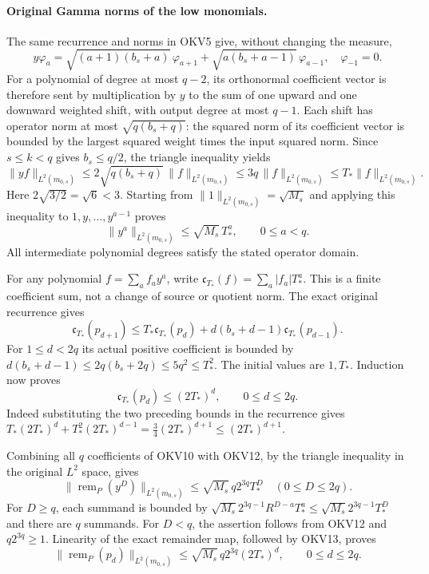 \documentclass[11pt,a4paper]{article}
\begin{document}
\paragraph{Original Gamma norms of the low monomials.}
The same recurrence and norms in OKV5 give, without changing the measure,
\[
 y\varphi_a=\sqrt{(a+1)(b_s+a)}\,\varphi_{a+1}
          +\sqrt{a(b_s+a-1)}\,\varphi_{a-1},
 \quad \varphi_{-1}=0.
 \tag{OKV11}
\]
For a polynomial of degree at most $q-2$, its orthonormal coefficient
vector is therefore sent by multiplication by $y$ to the sum of
one upward and one downward weighted shift, with output degree at most
$q-1$. Each shift has operator norm at most
$\sqrt{q(b_s+q)}$: the squared norm of its coefficient vector is
bounded by the largest squared weight times the input squared norm.
Since $s\le k<q$ gives $b_s\le q/2$, the triangle inequality yields
\[
 \|yf\|_{L^2(m_{0,s})}
       \le2\sqrt{q(b_s+q)}\,\|f\|_{L^2(m_{0,s})}
       \le3q\,\|f\|_{L^2(m_{0,s})}
       \le T_*\|f\|_{L^2(m_{0,s})}.
\]
Here $2\sqrt{3/2}=\sqrt6<3$. Starting from
$\|1\|_{L^2(m_{0,s})}=\sqrt{M_s}$ and applying this inequality
to $1,y,\ldots,y^{a-1}$ proves
\[
 \boxed{\|y^a\|_{L^2(m_{0,s})}\le\sqrt{M_s}\,T_*^a,
                      \qquad0\le a<q.}
 \tag{OKV12}
\]
All intermediate polynomial degrees satisfy the stated operator domain.

For any polynomial $f=\sum_a f_a y^a$, write
$\mathfrak c_{T_*}(f)=\sum_a|f_a|T_*^a$. This is a finite
coefficient sum, not a change of source or quotient norm.
The exact original recurrence gives
\[
 \mathfrak c_{T_*}(p_{d+1})
 \le T_*\mathfrak c_{T_*}(p_d)
       +d(b_s+d-1)\mathfrak c_{T_*}(p_{d-1}).
\]
For $1\le d<2q$ its actual positive coefficient is bounded by
$d(b_s+d-1)\le2q(b_s+2q)\le5q^2\le T_*^2$.
The initial values are $1,T_*$. Induction now proves
\[
 \boxed{\mathfrak c_{T_*}(p_d)\le(2T_*)^d,
                            \qquad0\le d\le2q.}
 \tag{OKV13}
\]
Indeed substituting the two preceding bounds in the recurrence gives
$T_*(2T_*)^d+T_*^2(2T_*)^{d-1}
 =\tfrac34(2T_*)^{d+1}\le(2T_*)^{d+1}$.

Combining all $q$ coefficients of OKV10 with OKV12, by the triangle
inequality in the original $L^2$ space, gives
\[
 \|\operatorname{rem}_P(y^D)\|_{L^2(m_{0,s})}
           \le\sqrt{M_s}\,q2^{3q}T_*^D\quad(0\le D\le2q).
\]
For $D\ge q$, each summand is bounded by
$\sqrt{M_s}2^{3q-1}R^{D-a}T_*^a
 \le\sqrt{M_s}2^{3q-1}T_*^D$ and there are $q$ summands.
For $D<q$, the assertion follows from OKV12 and $q2^{3q}\ge1$.
Linearity of the exact remainder map, followed by OKV13, proves
\[
 \boxed{\|\operatorname{rem}_P(p_d)\|_{L^2(m_{0,s})}
         \le\sqrt{M_s}\,q2^{3q}(2T_*)^d,
                           \qquad0\le d\le2q.}
 \tag{OKV14}
\]
\end{document}
